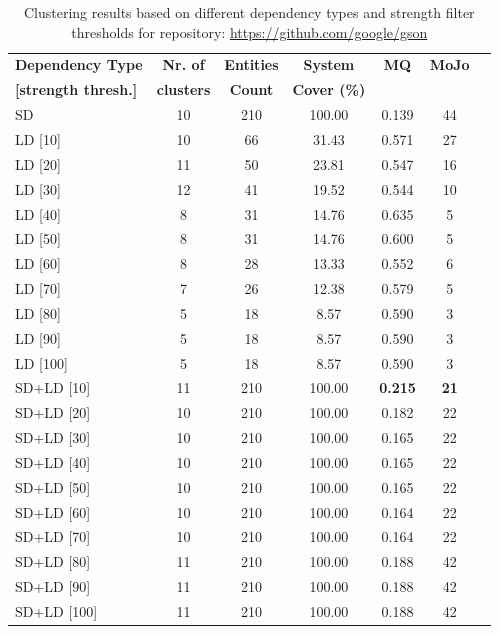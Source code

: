 \documentclass{ieeeaccess}
\begin{document}
\begin{table}
\caption{Clustering results based on different dependency types and strength filter thresholds for repository: \href{https://github.com/google/gson}{https://github.com/google/gson}}
\label{tab:clustering_results_gson}
\centering
\setlength{\tabcolsep}{3pt}
\begin{tabular}{|l|c|c|c|c|c|c|}
\hline
\textbf{Dependency Type} & \textbf{Nr. of} & \textbf{Entities} & \textbf{System} & \textbf{MQ} & \textbf{MoJo} \\
\textbf{[strength thresh.]} & \textbf{clusters} & \textbf{Count} & \textbf{Cover (\%)} &  &  \\
\hline
SD & 10 & 210 & 100.00 & 0.139 & 44 \\
\hline
LD [10] & 10 & 66 & 31.43 & 0.571 & 27 \\
LD [20] & 11 & 50 & 23.81 & 0.547 & 16 \\
LD [30] & 12 & 41 & 19.52 & 0.544 & 10 \\
LD [40] & 8 & 31 & 14.76 & 0.635 & 5 \\
LD [50] & 8 & 31 & 14.76 & 0.600 & 5 \\
LD [60] & 8 & 28 & 13.33 & 0.552 & 6 \\
LD [70] & 7 & 26 & 12.38 & 0.579 & 5 \\
LD [80] & 5 & 18 & 8.57 & 0.590 & 3 \\
LD [90] & 5 & 18 & 8.57 & 0.590 & 3 \\
LD [100] & 5 & 18 & 8.57 & 0.590 & 3 \\
\hline
SD+LD [10] & 11 & 210 & 100.00 & \cellcolor[HTML]{C0C0C0}\textbf{0.215} & \cellcolor[HTML]{C0C0C0}\textbf{21} \\
SD+LD [20] & 10 & 210 & 100.00 & 0.182 & 22 \\
SD+LD [30] & 10 & 210 & 100.00 & 0.165 & 22 \\
SD+LD [40] & 10 & 210 & 100.00 & 0.165 & 22 \\
SD+LD [50] & 10 & 210 & 100.00 & 0.165 & 22 \\
SD+LD [60] & 10 & 210 & 100.00 & 0.164 & 22 \\
SD+LD [70] & 10 & 210 & 100.00 & 0.164 & 22 \\
SD+LD [80] & 11 & 210 & 100.00 & 0.188 & 42 \\
SD+LD [90] & 11 & 210 & 100.00 & 0.188 & 42 \\
SD+LD [100] & 11 & 210 & 100.00 & 0.188 & 42 \\
\hline
\end{tabular}
\end{table}
\end{document}
